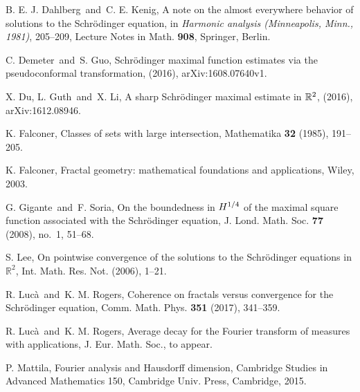 \documentclass[biblatex]{pzorin-note}
\begin{document}
\begin{thebibliography}{15}
B. E. J. Dahlberg\ and\ C. E. Kenig, A note on the almost everywhere behavior of solutions to the Schr\"odinger equation,
in {\it Harmonic analysis (Minneapolis, Minn., 1981)}, 205--209,
Lecture Notes in Math. {\bf 908}, Springer, Berlin.


 C. Demeter\ and\ S. Guo, Schr\"odinger maximal function estimates via the pseudoconformal transformation, (2016), arXiv:1608.07640v1.

 X. Du, L. Guth\ and\ X. Li, A sharp Schr\"odinger maximal estimate in $\mathbb{R}^2$, (2016), arXiv:1612.08946.


 K. Falconer, Classes of sets with large intersection, Mathematika {\bf 32} (1985), 191--205.

 K. Falconer, Fractal geometry: mathematical foundations and applications, Wiley, 2003.








 G. Gigante\ and\ F. Soria, On the boundedness in $H\sp {1/4}$ of the maximal square function associated with the Schr\"odinger equation, J. Lond. Math. Soc. {\bf 77} (2008), no.~1, 51--68.

 S. Lee, On pointwise convergence of the solutions to the Schr\"{o}dinger equations in $\mathbb{R}^{2}$, {Int. Math. Res. Not.} (2006), 1--21.



R. Luc\`a\ and\ K. M. Rogers, Coherence on fractals versus convergence for the Schr\"odinger equation, Comm. Math. Phys. {\bf 351} (2017), 341--359.



R. Luc\`a\ and\ K. M. Rogers, Average decay for the Fourier transform of measures with applications, J. Eur. Math. Soc., to appear.


 P. Mattila, Fourier analysis and Hausdorff dimension, Cambridge Studies in Advanced Mathematics 150, Cambridge Univ. Press, Cambridge, 2015.







\end{thebibliography}
\end{document}
